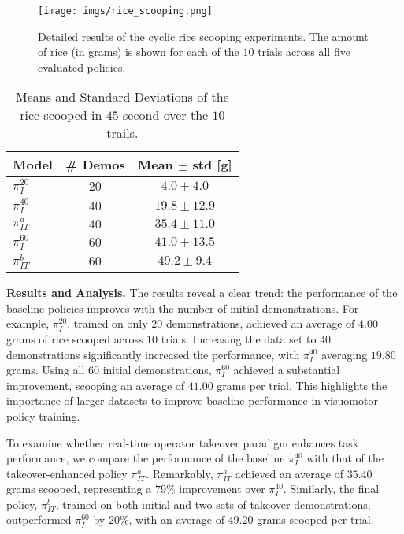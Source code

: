 \begin{figure}[t] \centering \texttt{[image: imgs/rice\_scooping.png]} \caption{Detailed results of the cyclic rice scooping experiments. The amount of rice (in grams) is shown for each of the $10$ trials across all five evaluated policies.} \label{fig:results} \end{figure}



\begin{table}[h!]
\label{tab:scoop_mean}
\centering
\begin{tabular}{|l|c|c|}
\hline
\textbf{Model}   & \textbf{\# Demos} & \textbf{Mean $\pm$ std [g]} \\ \hline \hline
$\pi_I^{20}$        & $20$                         & $4.0 \pm 4.0$                           \\ \hline \hline
$\pi_I^{40}$        & $40$                         & $19.8 \pm 12.9$                         \\ \hline
$\pi_{IT}^{a}$          & $40$                         & $\mathbf{35.4 \pm 11.0}$                         \\ \hline \hline
$\pi_I^{60}$         & $60$                         & $41.0 \pm 13.5$                         \\ \hline
$\pi_{IT}^{b}$          & $60$                         & $\mathbf{49.2 \pm 9.4}$                           \\ \hline
\end{tabular}
\caption{Means and Standard Deviations of the rice scooped in $45$ second over the $10$ trails.}
\end{table}

\textbf{Results and Analysis.}
The results reveal a clear trend: the performance of the baseline policies improves with the number of initial demonstrations. For example, $\pi_I^{20}$, trained on only $20$ demonstrations, achieved an average of $4.00$ grams of rice scooped across $10$ trials. Increasing the data set to $40$ demonstrations significantly increased the performance, with $\pi_I^{40}$ averaging $19.80$ grams. Using all $60$ initial demonstrations, $\pi_I^{60}$ achieved a substantial improvement, scooping an average of $41.00$ grams per trial. This highlights the importance of larger datasets to improve baseline performance in visuomotor policy training.

To examine whether real-time operator takeover paradigm enhances task performance, we compare the performance of the baseline $\pi_I^{40}$ with that of the takeover-enhanced policy $\pi_{IT}^a$. Remarkably, $\pi_{IT}^a$ achieved an average of $35.40$ grams scooped, representing a $79\%$ improvement over $\pi_I^{40}$. Similarly, the final policy, $\pi_{IT}^b$, trained on both initial and two sets of takeover demonstrations, outperformed $\pi_I^{60}$ by $20\%$, with an average of $49.20$ grams scooped per trial.

